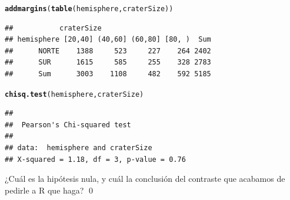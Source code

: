 \documentclass[10pt,a4paper]{article}\usepackage[]{graphicx}\usepackage[]{color}
\makeatletter
\newcommand{\hlstd}[1]{\textcolor[rgb]{0.345,0.345,0.345}{#1}}%
\newcommand{\hlkwd}[1]{\textcolor[rgb]{0.737,0.353,0.396}{\textbf{#1}}}%
\newenvironment{kframe}{%
 \def\at@end@of@kframe{}%
 \ifinner\ifhmode%
  \def\at@end@of@kframe{\end{minipage}}%
  \begin{minipage}{\columnwidth}%
 \fi\fi%
 \def\FrameCommand##1{\hskip\@totalleftmargin \hskip-\fboxsep
 \colorbox{shadecolor}{##1}\hskip-\fboxsep
     \hskip-\linewidth \hskip-\@totalleftmargin \hskip\columnwidth}%
 \MakeFramed {\advance\hsize-\width
   \@totalleftmargin\z@ \linewidth\hsize
   \@setminipage}}%
 {\par\unskip\endMakeFramed%
 \at@end@of@kframe}
\newenvironment{knitrout}{}{} %
\newcounter {cont01}
\makeatother
\begin{document}
\begin{knitrout}
\color{fgcolor}\begin{kframe}
\begin{alltt}
\hlkwd{addmargins}\hlstd{(}\hlkwd{table}\hlstd{(hemisphere, craterSize))}
\end{alltt}
\begin{verbatim}
##           craterSize
## hemisphere [20,40] (40,60] (60,80] [80, )  Sum
##      NORTE    1388     523     227    264 2402
##      SUR      1615     585     255    328 2783
##      Sum      3003    1108     482    592 5185
\end{verbatim}
\begin{alltt}
\hlkwd{chisq.test}\hlstd{(hemisphere, craterSize)}
\end{alltt}
\begin{verbatim}
## 
## 	Pearson's Chi-squared test
## 
## data:  hemisphere and craterSize
## X-squared = 1.18, df = 3, p-value = 0.76
\end{verbatim}
\end{kframe}
\end{knitrout}

\begin{ejercicio}
\label{tut12:ejercicio05}
¿Cuál es la hipótesis nula, y cuál la conclusión del contraste que acabamos de pedirle a R que haga?
\qed
\end{ejercicio}
\end{document}
